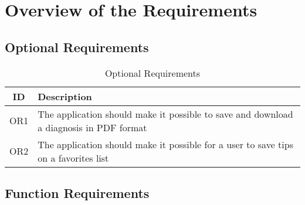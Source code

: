 \tocless\chapter{Overview of the Requirements}
\tocless\section{Optional Requirements}
\begin{table}[H]
	\begin{center}
		\scriptsize
		\def\arraystretch{1.5}%
		\begin{tabular}{ c|l }
			\hline
			\textbf{ID} & \textbf{Description}  \\
			\hline
			OR1 & The application should make it possible to save and download a diagnosis in PDF format  \\
			\hline
			OR2 & The application should make it possible for a user to save tips on a favorites list  \\
			\hline	
		\end{tabular}
		\normalsize
	\end{center}
	\caption{Optional Requirements}
\end{table}
\tocless\section{Function Requirements}
